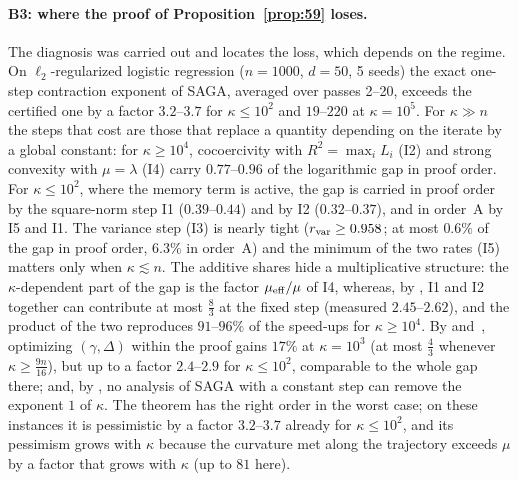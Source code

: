 \paragraph{B3: where the proof of Proposition~\ref{prop:59} loses.}
The diagnosis was carried out and locates the loss, which depends on the regime. On $\ell_2$-regularized logistic
regression ($n=1000$, $d=50$, 5 seeds) the exact one-step contraction exponent of SAGA, averaged over passes 2--20,
exceeds the certified one by a factor $3.2$--$3.7$ for $\kappa\le10^2$ and $19$--$220$ at $\kappa=10^5$. For $\kappa\gg
n$ the steps that cost are those that replace a quantity depending on the iterate by a global constant: for
$\kappa\ge10^4$, cocoercivity with $R^2=\max_iL_i$ (I2) and strong convexity with $\mu=\lambda$ (I4) carry
$0.77$--$0.96$ of the logarithmic gap in proof order. For $\kappa\le10^2$, where the memory term is active, the gap is
carried in proof order by the square-norm step I1 ($0.39$--$0.44$) and by I2 ($0.32$--$0.37$), and in order~A by I5
and I1. The variance step (I3) is nearly tight ($r_{\rm var}\ge0.958$; at most $0.6\%$ of the gap in proof order,
$6.3\%$ in order~A) and the minimum of the two rates (I5) matters only when $\kappa\lesssim n$. The additive shares hide
a multiplicative structure: the $\kappa$-dependent part of the gap is the factor $\mu_{\mathrm{eff}}/\mu$ of I4, whereas, by
, I1 and I2 together can contribute at most $\frac83$ at the fixed step (measured
$2.45$--$2.62$), and the product of the two reproduces $91$--$96\%$ of the speed-ups for $\kappa\ge10^4$. By
 and~, optimizing $(\gamma,\Delta)$ within the proof gains $17\%$
at $\kappa=10^3$ (at most $\frac43$ whenever $\kappa\ge\frac{9n}{16}$), but up to a factor $2.4$--$2.9$ for
$\kappa\le10^2$, comparable to the whole gap there; and, by , no analysis of SAGA with a constant
step can remove the exponent $1$ of $\kappa$. The theorem has the right order in the worst case; on these instances it
is pessimistic by a factor $3.2$--$3.7$ already for $\kappa\le10^2$, and its pessimism grows with $\kappa$ because the
curvature met along the trajectory exceeds $\mu$ by a factor that grows with $\kappa$ (up to $81$ here).

